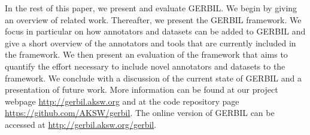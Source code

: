 





In the rest of this paper, we present and evaluate GERBIL. 
We begin by giving an overview of related work.
Thereafter, we present the GERBIL framework.
We focus in particular on how annotators and datasets can be added to GERBIL and give a short overview of the annotators and tools that are currently included in the framework. 
We then present an evaluation of the framework that aims to quantify the effort necessary to include novel annotators and datasets to the framework. 
We conclude with a discussion of the current state of GERBIL and a presentation of future work. 
More information can be found at our project webpage \url{http://gerbil.aksw.org} and at the code repository page \url{https://github.com/AKSW/gerbil}.
The online version of GERBIL can be accessed at \url{http://gerbil.aksw.org/gerbil}.

